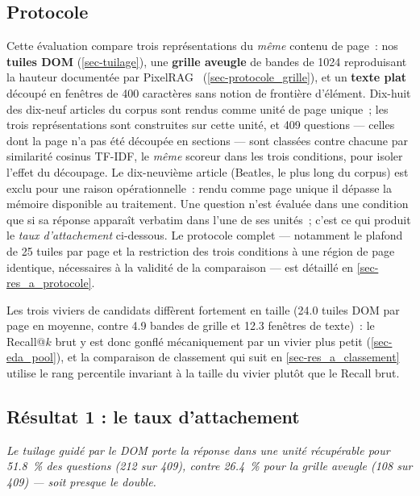 \subsection{Protocole}

Cette évaluation compare trois représentations du \emph{même} contenu de
page~: nos \textbf{tuiles DOM} (\cref{sec-tuilage}), une \textbf{grille
aveugle} de bandes de \SI{1024}{\pixel} reproduisant la hauteur documentée par
PixelRAG~\citep{pixelrag2026} (\cref{sec-protocole_grille}), et un
\textbf{texte plat} découpé en fenêtres de \num{400} caractères sans notion de
frontière d'élément. Dix-huit des dix-neuf articles du corpus sont rendus comme
unité de page unique~; les trois représentations sont construites sur cette
unité, et \num{409} questions --- celles dont la page n'a pas été découpée en
sections --- sont classées contre chacune par similarité cosinus TF-IDF, le
\emph{même} scoreur dans les trois conditions, pour isoler l'effet du
découpage. Le dix-neuvième article (Beatles, le plus long du corpus) est exclu
pour une raison opérationnelle~: rendu comme page unique il dépasse la mémoire
disponible au traitement. Une question n'est évaluée dans une condition que si
sa réponse apparaît verbatim dans l'une de ses unités~; c'est ce qui produit le
\emph{taux d'attachement} ci-dessous. Le protocole complet --- notamment le
plafond de \num{25} tuiles par page et la restriction des trois conditions à
une région de page identique, nécessaires à la validité de la comparaison ---
est détaillé en \cref{sec-res_a_protocole}.

Les trois viviers de candidats diffèrent fortement en taille (\num{24.0}
tuiles DOM par page en moyenne, contre \num{4.9} bandes de grille et
\num{12.3} fenêtres de texte)~: le Recall@$k$ brut y est donc gonflé
mécaniquement par un vivier plus petit (\cref{sec-eda_pool}), et la
comparaison de classement qui suit en \cref{sec-res_a_classement} utilise
le rang percentile invariant à la taille du vivier plutôt que le Recall brut.

\subsection{Résultat 1 : le taux d'attachement}
\label{sec-res_a_attach}

\begin{center}
\begin{minipage}{0.9\textwidth}
\itshape
Le tuilage guidé par le DOM porte la réponse dans une unité récupérable pour
\SI{51.8}{\percent} des questions (\num{212} sur \num{409}), contre
\SI{26.4}{\percent} pour la grille aveugle (\num{108} sur \num{409}) --- soit
\emph{presque le double}.
\end{minipage}
\end{center}


